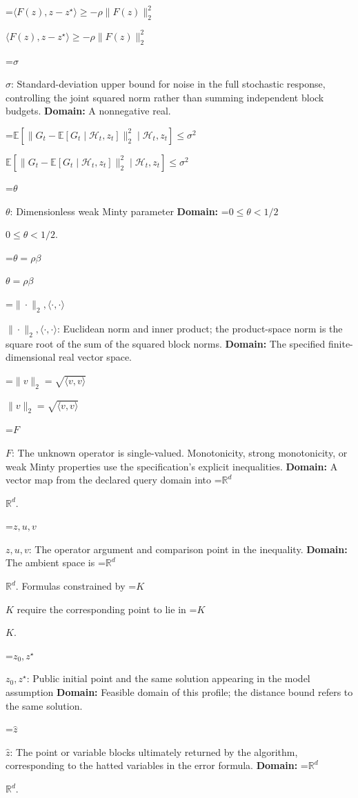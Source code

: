\documentclass[10pt,a4paper]{article}
\newcommand{\AtlasMath}[1]{\par\begingroup\centering\setbox0=\hbox{$\displaystyle #1$}\ifdim\wd0>1.4\linewidth\typeout{ATLAS WIDE FORMULA: \the\wd0}\fi\ifdim\wd0>\linewidth\resizebox{\linewidth}{!}{\box0}\else\box0\fi\par\endgroup}
\newcommand{\AtlasInlineMath}[1]{\begingroup\setbox0=\hbox{$#1$}\ifdim\wd0>.4\linewidth\endgroup\AtlasMath{#1}\else\endgroup$#1$\fi}
\begin{document}
\AtlasInlineMath{\langle F(z),z-z^\star\rangle\ge-\rho\|F(z)\|_2^2}



\AtlasInlineMath{\sigma}: Standard-deviation upper bound for noise in the full stochastic response, controlling the joint squared norm rather than summing independent block budgets. \textbf{Domain:} A nonnegative real.



\AtlasInlineMath{\mathbb E[\|G_t-\mathbb E[G_t\mid\mathcal H_t,z_t]\|_2^2\mid\mathcal H_t,z_t]\le\sigma^2}



\AtlasInlineMath{\theta}: Dimensionless weak Minty parameter \textbf{Domain:} \AtlasInlineMath{0\le\theta<1/2}.



\AtlasInlineMath{\theta=\rho\beta}



\AtlasInlineMath{\|\cdot\|_2,\langle\cdot,\cdot\rangle}: Euclidean norm and inner product; the product-space norm is the square root of the sum of the squared block norms. \textbf{Domain:} The specified finite-dimensional real vector space.



\AtlasInlineMath{\|v\|_2=\sqrt{\langle v,v\rangle}}



\AtlasInlineMath{F}: The unknown operator is single-valued. Monotonicity, strong monotonicity, or weak Minty properties use the specification’s explicit inequalities. \textbf{Domain:} A vector map from the declared query domain into \AtlasInlineMath{\mathbb R^d}.



\AtlasInlineMath{z,u,v}: The operator argument and comparison point in the inequality. \textbf{Domain:} The ambient space is \AtlasInlineMath{\mathbb R^d}. Formulas constrained by \AtlasInlineMath{K} require the corresponding point to lie in \AtlasInlineMath{K}.



\AtlasInlineMath{z_0,z^\star}: Public initial point and the same solution appearing in the model assumption \textbf{Domain:} Feasible domain of this profile; the distance bound refers to the same solution.



\AtlasInlineMath{\widehat z}: The point or variable blocks ultimately returned by the algorithm, corresponding to the hatted variables in the error formula. \textbf{Domain:} \AtlasInlineMath{\mathbb R^d}.
\end{document}
